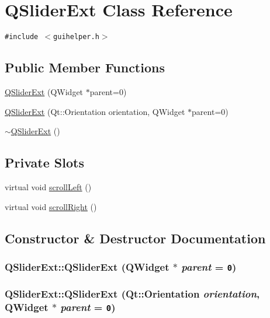 \hypertarget{class_q_slider_ext}{
\section{QSliderExt Class Reference}
\label{class_q_slider_ext}
}
{\tt \#include $<$guihelper.h$>$}

\subsection*{Public Member Functions}
\begin{CompactItemize}
\item 
\hyperlink{class_q_slider_ext_3c03246450b1a1532c2b395d22e923b2}{QSliderExt} (QWidget $\ast$parent=0)
\item 
\hyperlink{class_q_slider_ext_fcb0a15d92833188fc7dd326c9d054fc}{QSliderExt} (Qt::Orientation orientation, QWidget $\ast$parent=0)
\item 
\hyperlink{class_q_slider_ext_3914f975e99b626eef6a2cc394aae511}{$\sim$QSliderExt} ()
\end{CompactItemize}
\subsection*{Private Slots}
\begin{CompactItemize}
\item 
virtual void \hyperlink{class_q_slider_ext_6901a38010159323854101e31306e420}{scrollLeft} ()
\item 
virtual void \hyperlink{class_q_slider_ext_69fcb3e8939cbf5945b52e5851549a45}{scrollRight} ()
\end{CompactItemize}


\subsection{Constructor \& Destructor Documentation}
\hypertarget{class_q_slider_ext_3c03246450b1a1532c2b395d22e923b2}{
\subsubsection[{QSliderExt}]{\setlength{\rightskip}{0pt plus 5cm}QSliderExt::QSliderExt (QWidget $\ast$ {\em parent} = {\tt 0})}}
\label{class_q_slider_ext_3c03246450b1a1532c2b395d22e923b2}


\hypertarget{class_q_slider_ext_fcb0a15d92833188fc7dd326c9d054fc}{
\subsubsection[{QSliderExt}]{\setlength{\rightskip}{0pt plus 5cm}QSliderExt::QSliderExt (Qt::Orientation {\em orientation}, \/  QWidget $\ast$ {\em parent} = {\tt 0})}}
\label{class_q_slider_ext_fcb0a15d92833188fc7dd326c9d054fc}


